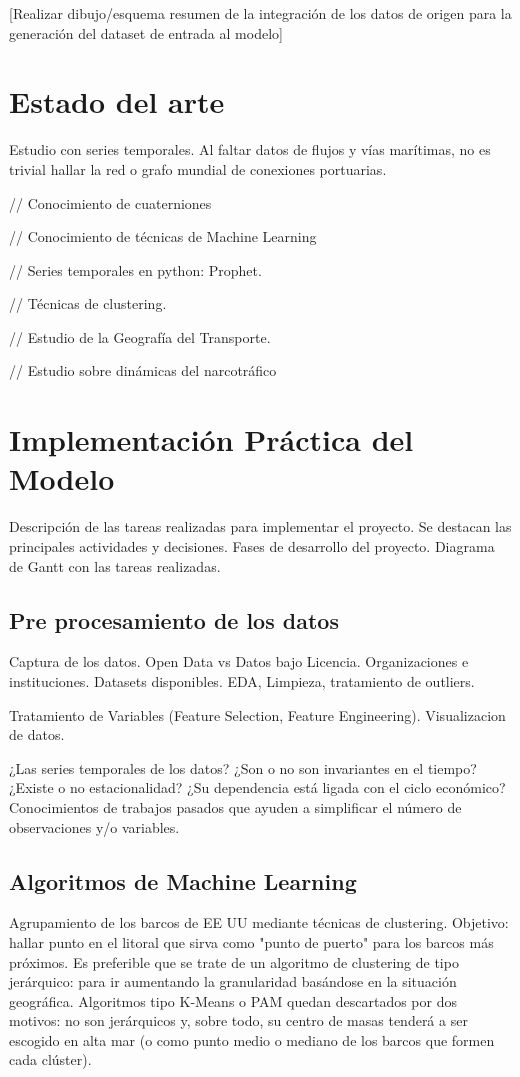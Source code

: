 \documentclass{article}
\begin{document}
[Realizar dibujo/esquema resumen de la integración de los datos de origen para la generación del dataset de entrada al modelo]

\section{Estado del arte}
Estudio con series temporales.
Al faltar datos de flujos y vías marítimas, no es trivial hallar la red o grafo mundial de conexiones portuarias.

// Conocimiento de cuaterniones


// Conocimiento de técnicas de Machine Learning


// Series temporales en python: Prophet.


// Técnicas de clustering.


// Estudio de la Geografía del Transporte.


// Estudio sobre dinámicas del narcotráfico


\section{Implementación Práctica del Modelo}
Descripción de las tareas realizadas para implementar el proyecto.
Se destacan las principales actividades y decisiones.
Fases de desarrollo del proyecto.
Diagrama de Gantt con las tareas realizadas.
\subsection{Pre procesamiento de los datos}
Captura de los datos. Open Data vs Datos bajo Licencia. Organizaciones e instituciones. Datasets disponibles.
EDA, Limpieza, tratamiento de outliers.

Tratamiento de Variables (Feature Selection, Feature Engineering).
Visualizacion de datos.

¿Las series temporales de los datos? ¿Son o no son invariantes en el tiempo?¿Existe o no estacionalidad? ¿Su dependencia está ligada con el ciclo económico?
Conocimientos de trabajos pasados que ayuden a simplificar el número de observaciones y/o variables.
\subsection{Algoritmos de Machine Learning}
Agrupamiento de los barcos de EE UU mediante técnicas de clustering. Objetivo: hallar punto en el litoral que sirva como "punto de puerto" para los barcos más próximos. Es preferible que se trate de un algoritmo de clustering de tipo jerárquico: para ir aumentando la granularidad basándose en la situación geográfica.
Algoritmos tipo K-Means o PAM quedan descartados por dos motivos: no son jerárquicos y, sobre todo, su centro de masas tenderá a ser escogido en alta mar (o como punto medio o mediano de los barcos que formen cada clúster).
\end{document}
